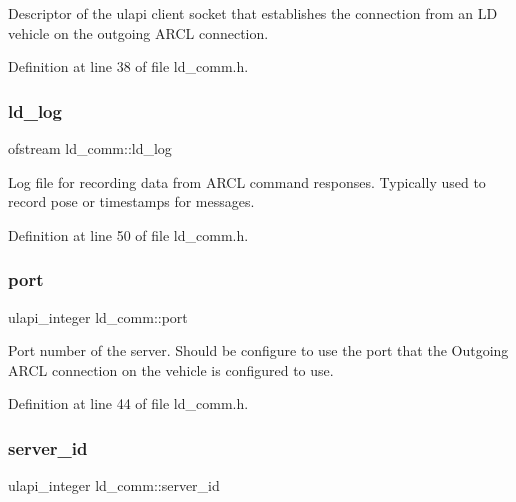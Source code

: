 Descriptor of the ulapi client socket that establishes the connection from an LD vehicle on the outgoing A\+R\+CL connection. 

Definition at line 38 of file ld\+\_\+comm.\+h.

\mbox{\label{classld__comm_abf5e010b5bee334a7087c7b6a689a5b4}} 
\subsubsection{\texorpdfstring{ld\+\_\+log}{ld\_log}}
{\footnotesize\ttfamily ofstream ld\+\_\+comm\+::ld\+\_\+log\hspace{0.3cm}{\ttfamily [private]}}

Log file for recording data from A\+R\+CL command responses. Typically used to record pose or timestamps for messages. 

Definition at line 50 of file ld\+\_\+comm.\+h.

\mbox{\label{classld__comm_a9a62eff146f4d1e8bc97f240ef46f86a}} 
\subsubsection{\texorpdfstring{port}{port}}
{\footnotesize\ttfamily ulapi\+\_\+integer ld\+\_\+comm\+::port\hspace{0.3cm}{\ttfamily [private]}}

Port number of the server. Should be configure to use the port that the Outgoing A\+R\+CL connection on the vehicle is configured to use. 

Definition at line 44 of file ld\+\_\+comm.\+h.

\mbox{\label{classld__comm_adfea5281a7c35a0d84777f757dc70557}} 
\subsubsection{\texorpdfstring{server\+\_\+id}{server\_id}}
{\footnotesize\ttfamily ulapi\+\_\+integer ld\+\_\+comm\+::server\+\_\+id\hspace{0.3cm}{\ttfamily [private]}}

